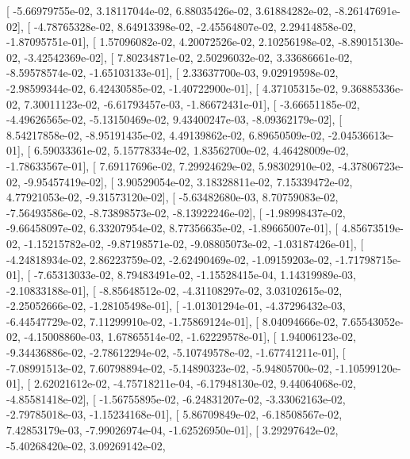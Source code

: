 \documentclass{article}
\begin{document}
       [ -5.66979755e-02,   3.18117044e-02,   6.88035426e-02,
          3.61884282e-02,  -8.26147691e-02],
       [ -4.78765328e-02,   8.64913398e-02,  -2.45564807e-02,
          2.29414858e-02,  -1.87095751e-01],
       [  1.57096082e-02,   4.20072526e-02,   2.10256198e-02,
         -8.89015130e-02,  -3.42542369e-02],
       [  7.80234871e-02,   2.50296032e-02,   3.33686661e-02,
         -8.59578574e-02,  -1.65103133e-01],
       [  2.33637700e-03,   9.02919598e-02,  -2.98599344e-02,
          6.42430585e-02,  -1.40722900e-01],
       [  4.37105315e-02,   9.36885336e-02,   7.30011123e-02,
         -6.61793457e-03,  -1.86672431e-01],
       [ -3.66651185e-02,  -4.49626565e-02,  -5.13150469e-02,
          9.43400247e-03,  -8.09362179e-02],
       [  8.54217858e-02,  -8.95191435e-02,   4.49139862e-02,
          6.89650509e-02,  -2.04536613e-01],
       [  6.59033361e-02,   5.15778334e-02,   1.83562700e-02,
          4.46428009e-02,  -1.78633567e-01],
       [  7.69117696e-02,   7.29924629e-02,   5.98302910e-02,
         -4.37806723e-02,  -9.95457419e-02],
       [  3.90529054e-02,   3.18328811e-02,   7.15339472e-02,
          4.77921053e-02,  -9.31573120e-02],
       [ -5.63482680e-03,   8.70759083e-02,  -7.56493586e-02,
         -8.73898573e-02,  -8.13922246e-02],
       [ -1.98998437e-02,  -9.66458097e-02,   6.33207954e-02,
          8.77356635e-02,  -1.89665007e-01],
       [  4.85673519e-02,  -1.15215782e-02,  -9.87198571e-02,
         -9.08805073e-02,  -1.03187426e-01],
       [ -4.24818934e-02,   2.86223759e-02,  -2.62490469e-02,
         -1.09159203e-02,  -1.71798715e-01],
       [ -7.65313033e-02,   8.79483491e-02,  -1.15528415e-04,
          1.14319989e-03,  -2.10833188e-01],
       [ -8.85648512e-02,  -4.31108297e-02,   3.03102615e-02,
         -2.25052666e-02,  -1.28105498e-01],
       [ -1.01301294e-01,  -4.37296432e-03,  -6.44547729e-02,
          7.11299910e-02,  -1.75869124e-01],
       [  8.04094666e-02,   7.65543052e-02,  -4.15008860e-03,
          1.67865514e-02,  -1.62229578e-01],
       [  1.94006123e-02,  -9.34436886e-02,  -2.78612294e-02,
         -5.10749578e-02,  -1.67741211e-01],
       [ -7.08991513e-02,   7.60798894e-02,  -5.14890323e-02,
         -5.94805700e-02,  -1.10599120e-01],
       [  2.62021612e-02,  -4.75718211e-04,  -6.17948130e-02,
          9.44064068e-02,  -4.85581418e-02],
       [ -1.56755895e-02,  -6.24831207e-02,  -3.33062163e-02,
         -2.79785018e-03,  -1.15234168e-01],
       [  5.86709849e-02,  -6.18508567e-02,   7.42853179e-03,
         -7.99026974e-04,  -1.62526950e-01],
       [  3.29297642e-02,  -5.40268420e-02,   3.09269142e-02,
\end{document}
